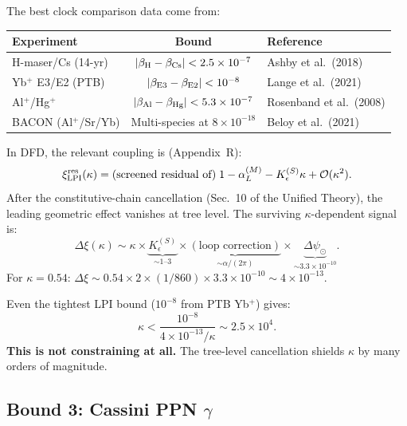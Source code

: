 \documentclass[11pt,a4paper]{article}
\theoremstyle{definition}
\begin{document}
The best clock comparison data come from:
\begin{center}
\small
\begin{tabular}{lcl}
\toprule
\textbf{Experiment} & \textbf{Bound} & \textbf{Reference} \\
\midrule
H-maser/Cs (14-yr) & $|\beta_{\rm H} - \beta_{\rm Cs}| < 2.5
  \times 10^{-7}$ & Ashby et al.\ (2018) \\
Yb$^+$ E3/E2 (PTB) & $|\beta_{\rm E3} - \beta_{\rm E2}| <
  10^{-8}$ & Lange et al.\ (2021) \\
Al$^+$/Hg$^+$ & $|\beta_{\rm Al} - \beta_{\rm Hg}| < 5.3
  \times 10^{-7}$ & Rosenband et al.\ (2008) \\
BACON (Al$^+$/Sr/Yb) & Multi-species at $8 \times 10^{-18}$ &
  Beloy et al.\ (2021) \\
\bottomrule
\end{tabular}
\end{center}

In DFD, the relevant coupling is (Appendix~R):
\begin{equation}
\xi_{\rm LPI}^{\rm res}(\kappa)
= \text{(screened residual of)}\;
  1 - \alpha_L^{(M)} - K_\epsilon^{(S)}\kappa
  + \mathcal{O}(\kappa^2).
\end{equation}
After the constitutive-chain cancellation (Sec.~10 of the Unified
Theory), the leading geometric effect vanishes at tree level.
The surviving $\kappa$-dependent signal is:
\begin{equation}
\Delta\xi(\kappa) \sim \kappa \times
\underbrace{K_\epsilon^{(S)}}_{\sim 1\text{--}3}
\times \underbrace{(\text{loop correction})}_{\sim \alpha/(2\pi)}
\times \underbrace{\Delta\psi_\odot}_{\sim 3.3\times 10^{-10}}.
\end{equation}
For $\kappa = 0.54$:
$\Delta\xi \sim 0.54 \times 2 \times (1/860) \times 3.3
\times 10^{-10} \sim 4 \times 10^{-13}$.

Even the tightest LPI bound ($10^{-8}$ from PTB Yb$^+$)
gives:
\begin{equation}
\kappa < \frac{10^{-8}}{4 \times 10^{-13}/\kappa}
\sim 2.5 \times 10^4.
\end{equation}
\textbf{This is not constraining at all.}  The tree-level
cancellation shields $\kappa$ by many orders of magnitude.

\subsection{Bound 3: Cassini PPN $\gamma$}
\label{sec:cassini}
\end{document}
